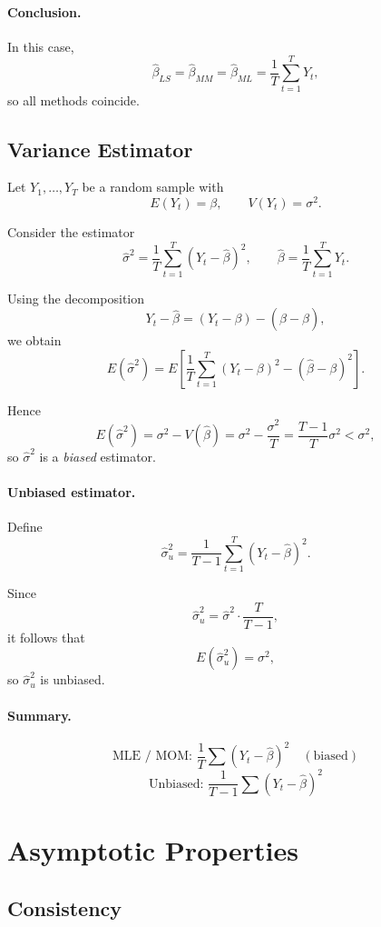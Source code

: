 \paragraph{Conclusion.}
In this case,
\[
\hat{\beta}_{LS}
=
\hat{\beta}_{MM}
=
\hat{\beta}_{ML}
=
\frac{1}{T}\sum_{t=1}^T Y_t,
\]
so all methods coincide.
\subsection{Variance Estimator}

Let $Y_1,\dots,Y_T$ be a random sample with
\[
E(Y_t)=\beta,
\qquad
V(Y_t)=\sigma^2.
\]

Consider the estimator
\[
\hat{\sigma}^2
=
\frac{1}{T}\sum_{t=1}^T (Y_t - \hat \beta)^2,
\qquad
\hat \beta = \frac{1}{T}\sum_{t=1}^T Y_t.
\]

Using the decomposition
\[
Y_t - \hat \beta
=
(Y_t - \beta) - (\hat \beta - \beta),
\]
we obtain
\[
E(\hat{\sigma}^2)
=
E\!\left[
\frac{1}{T}\sum_{t=1}^T (Y_t-\beta)^2
-
(\hat \beta-\beta)^2
\right].
\]

Hence
\[
E(\hat{\sigma}^2)
=
\sigma^2 - V(\hat \beta)
=
\sigma^2 - \frac{\sigma^2}{T}
=
\frac{T-1}{T}\sigma^2
<
\sigma^2,
\]
so $\hat{\sigma}^2$ is a \emph{biased} estimator.

\paragraph{Unbiased estimator.}
Define
\[
\hat{\sigma}^2_u
=
\frac{1}{T-1}\sum_{t=1}^T (Y_t - \hat \beta)^2.
\]

Since
\[
\hat{\sigma}^2_u
=
\hat{\sigma}^2 \cdot \frac{T}{T-1},
\]
it follows that
\[
E(\hat{\sigma}^2_u)
=
\sigma^2,
\]
so $\hat{\sigma}^2_u$ is unbiased.

\paragraph{Summary.}
\[
\text{MLE / MOM: } \frac{1}{T}\sum (Y_t-\hat \beta)^2 \quad (\text{biased})
\]
\[
\text{Unbiased: } \frac{1}{T-1}\sum (Y_t-\hat \beta)^2
\]


\section{Asymptotic Properties}

\subsection{Consistency}

